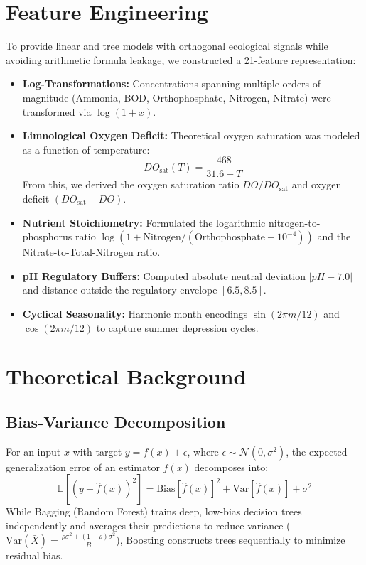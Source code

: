 \documentclass[journal,10pt,twocolumn]{IEEEtran}
\begin{document}
\section{Feature Engineering}
To provide linear and tree models with orthogonal ecological signals while avoiding arithmetic formula leakage, we constructed a 21-feature representation:
\begin{itemize}
    \item \textbf{Log-Transformations:} Concentrations spanning multiple orders of magnitude (Ammonia, BOD, Orthophosphate, Nitrogen, Nitrate) were transformed via $\log(1 + x)$.
    \item \textbf{Limnological Oxygen Deficit:} Theoretical oxygen saturation was modeled as a function of temperature:
    \begin{equation}
        DO_{\text{sat}}(T) = \frac{468}{31.6 + T}
    \end{equation}
    From this, we derived the oxygen saturation ratio $DO / DO_{\text{sat}}$ and oxygen deficit $(DO_{\text{sat}} - DO)$.
    \item \textbf{Nutrient Stoichiometry:} Formulated the logarithmic nitrogen-to-phosphorus ratio $\log(1 + \text{Nitrogen} / (\text{Orthophosphate} + 10^{-4}))$ and the Nitrate-to-Total-Nitrogen ratio.
    \item \textbf{pH Regulatory Buffers:} Computed absolute neutral deviation $|pH - 7.0|$ and distance outside the regulatory envelope $[6.5, 8.5]$.
    \item \textbf{Cyclical Seasonality:} Harmonic month encodings $\sin(2\pi m / 12)$ and $\cos(2\pi m / 12)$ to capture summer depression cycles.
\end{itemize}

\section{Theoretical Background}
\subsection{Bias-Variance Decomposition}
For an input $x$ with target $y = f(x) + \epsilon$, where $\epsilon \sim \mathcal{N}(0, \sigma^2)$, the expected generalization error of an estimator $\hat{f}(x)$ decomposes into:
\begin{equation}
    \mathbb{E}[(y - \hat{f}(x))^2] = \text{Bias}[\hat{f}(x)]^2 + \text{Var}[\hat{f}(x)] + \sigma^2
\end{equation}
While Bagging (Random Forest) trains deep, low-bias decision trees independently and averages their predictions to reduce variance ($\text{Var}(\bar{X}) = \frac{\rho \sigma^2 + (1-\rho)\sigma^2}{B}$), Boosting constructs trees sequentially to minimize residual bias.
\end{document}
